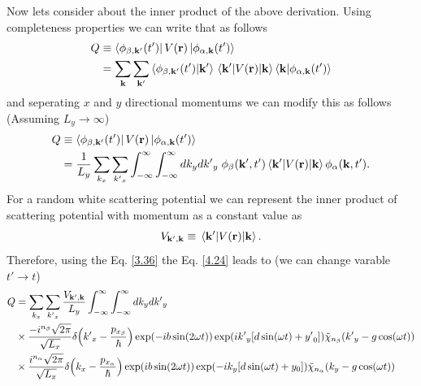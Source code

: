 \noindent
Now lets consider about the inner product of the above derivation. Using completeness properties we can write that as follows
\begin{equation} \label{4.23}
  \begin{aligned}
    Q & \equiv
    \bra{\phi_{\beta,\mathbf{k'}}(t')}
    V(\mathbf{r}) \ket{\phi_{\alpha,\mathbf{k}}(t')} \\
    & =
    \sum_{\mathbf{k}}\sum_{\mathbf{k'}}
    \braket{\phi_{\beta,\mathbf{k'}}(t')}{\mathbf{k'}}
    \mel{\mathbf{k'}}{V(\mathbf{r})}{\mathbf{k}}
    \braket{\mathbf{k}}{\phi_{\alpha,\mathbf{k}}(t')}
  \end{aligned}
\end{equation}
and seperating $x$ and $y$ directional momentums we can modify this as follows (Assuming $L_y \rightarrow \infty$)
\begin{equation} \label{4.24}
  \begin{aligned}
    Q & \equiv
    \bra{\phi_{\beta,\mathbf{k'}}(t')}
    V(\mathbf{r}) \ket{\phi_{\alpha,\mathbf{k}}(t')} \\
    & =
    \frac{1}{L_y}
    \sum_{k_x}\sum_{{k'}_x}
    \int_{-\infty}^{\infty} \int_{-\infty}^{\infty} dk_y d{k'}_y \;
    \phi_{\beta}(\mathbf{k'},t')
    \mel{\mathbf{k'}}{V(\mathbf{r})}{\mathbf{k}}
    \phi_{\alpha}(\mathbf{k},t').
  \end{aligned}
\end{equation}
For a random white scattering potential we can represent the inner product of scattering potential with momentum as a constant value as
\begin{equation} \label{4.25}
  V_{\mathbf{k'},\mathbf{k}} \equiv \mel{\mathbf{k'}}{V(\mathbf{r})}{\mathbf{k}}.
\end{equation}
Therefore, using the Eq. \eqref{3.36} the Eq. \eqref{4.24} leads to (we can change varable $t' \rightarrow t$)
\begin{equation} \label{4.26}
  \begin{aligned}
    Q & =
    \sum_{k_x}\sum_{{k'}_x}
    \frac{V_{\mathbf{k'},\mathbf{k}}}{L_y}
    \int_{-\infty}^{\infty} \int_{-\infty}^{\infty} dk_y d{k'}_y \; \\
    & \times
    \frac{-i^{n_{\beta}}\sqrt{2\pi}}{\sqrt{L_x}}
    \delta\qty({k'}_x -\frac{p_{x_{\beta}}}{\hbar})
    \exp(
      -ib\sin(2\omega t)
    )
    \exp(
      i{k'}_y  \qty[d\sin(\omega t) + {y'}_0]
    )
    \tilde{\chi}_{n_{\beta}}\qty({k'}_y -g\cos(\omega t))
    \\
    & \times
    \frac{i^{n_{\alpha}}\sqrt{2\pi}}{\sqrt{L_x}}
    \delta\qty(k_x -\frac{p_{x_{\alpha}}}{\hbar})
    \exp(
      ib\sin(2\omega t)
    )
    \exp(
      -ik_y  \qty[d\sin(\omega t) + y_0]
    )
    \tilde{\chi}_{n_{\alpha}}\qty(k_y -g\cos(\omega t))
  \end{aligned}
\end{equation}
